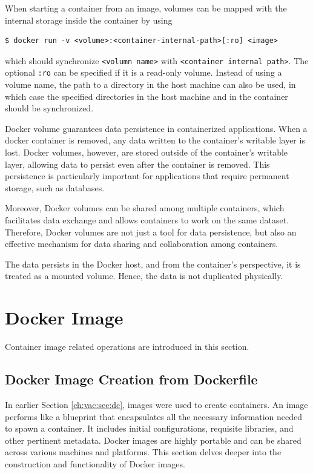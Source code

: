 When starting a container from an image, volumes can be mapped with the internal storage inside the container by using
\begin{lstlisting}
$ docker run -v <volume>:<container-internal-path>[:ro] <image>
\end{lstlisting}
which should synchronize \verb|<volumn name>| with \verb|<container internal path>|. The optional \verb|:ro| can be specified if it is a read-only volume. Instead of using a volume name, the path to a directory in the host machine can also be used, in which case the specified directories in the host machine and in the container should be synchronized.

Docker volume guarantees data persistence in containerized applications. When a docker container is removed, any data written to the container's writable layer is lost. Docker volumes, however, are stored outside of the container's writable layer, allowing data to persist even after the container is removed. This persistence is particularly important for applications that require permanent storage, such as databases.

Moreover, Docker volumes can be shared among multiple containers, which facilitates data exchange and allows containers to work on the same dataset. Therefore, Docker volumes are not just a tool for data persistence, but also an effective mechanism for data sharing and collaboration among containers.

The data persists in the Docker host, and from the container's perspective, it is treated as a mounted volume. Hence, the data is not duplicated physically.


\section{Docker Image} \label{ch:vac:sec:di}

Container image related operations are introduced in this section.

\subsection{Docker Image Creation from Dockerfile}

In earlier Section \ref{ch:vac:sec:dc}, images were used to create containers. An image performs like a blueprint that encapsulates all the necessary information needed to spawn a container. It includes initial configurations, requisite libraries, and other pertinent metadata. Docker images are highly portable and can be shared across various machines and platforms. This section delves deeper into the construction and functionality of Docker images.

